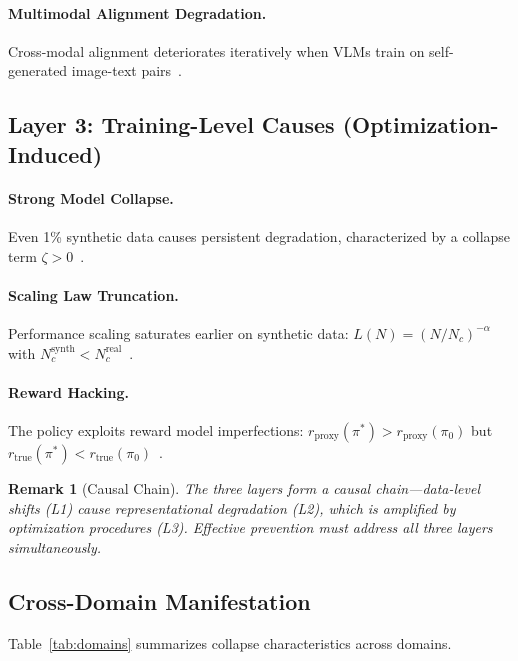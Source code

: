 \documentclass[11pt]{article}
\newtheorem{remark}{Remark}
\begin{document}
\paragraph{Multimodal Alignment Degradation.} Cross-modal alignment deteriorates iteratively when VLMs train on self-generated image-text pairs~\citep{multimodal2025collapse}.

\subsection{Layer 3: Training-Level Causes (Optimization-Induced)}
\label{sec:layer3}

\paragraph{Strong Model Collapse.} Even 1\% synthetic data causes persistent degradation, characterized by a collapse term $\zeta > 0$~\citep{dohmatob2024strong}.

\paragraph{Scaling Law Truncation.} Performance scaling saturates earlier on synthetic data: $L(N) = (N/N_c)^{-\alpha}$ with $N_c^{\mathrm{synth}} < N_c^{\mathrm{real}}$~\citep{dohmatob2024strong,scaling2025synthetic}.

\paragraph{Reward Hacking.} The policy exploits reward model imperfections: $r_{\mathrm{proxy}}(\pi^*) > r_{\mathrm{proxy}}(\pi_0)$ but $r_{\mathrm{true}}(\pi^*) < r_{\mathrm{true}}(\pi_0)$~\citep{constrained2023}.

\begin{remark}[Causal Chain]
The three layers form a causal chain---data-level shifts (L1) cause representational degradation (L2), which is amplified by optimization procedures (L3). Effective prevention must address all three layers simultaneously.
\end{remark}

\subsection{Cross-Domain Manifestation}

Table~\ref{tab:domains} summarizes collapse characteristics across domains.
\end{document}
